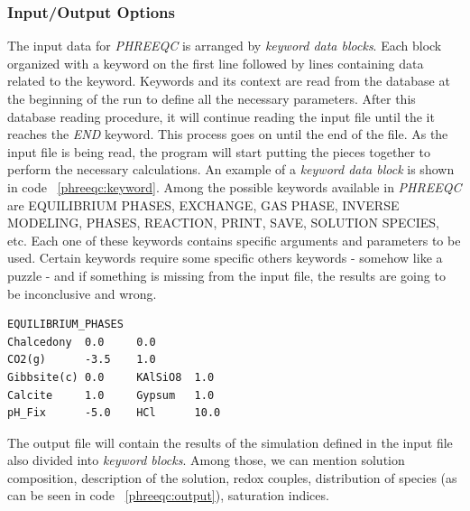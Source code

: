 \documentclass[ppgc,mestrado,english]{iiufrgs}
\begin{document}
\subsubsection{Input/Output Options}
The input data for \emph{PHREEQC} is arranged by \emph{keyword data blocks}. Each block organized with a keyword on the first line followed by lines containing data related to the keyword. Keywords and its context are read from the database at the beginning of the run to define all the necessary parameters. After this database reading procedure, it will continue reading the input file until the it reaches the \emph{END} keyword. This process goes on until the end of the file. As the input file is being read, the program will start putting the pieces together to perform the necessary calculations. An example of a \emph{keyword data block} is shown in code ~\ref{phreeqc:keyword}. Among the possible keywords available in \emph{PHREEQC} are EQUILIBRIUM PHASES, EXCHANGE, GAS PHASE, INVERSE MODELING, PHASES, REACTION, PRINT, SAVE, SOLUTION SPECIES, etc. Each one of these keywords contains specific arguments and parameters to be used. Certain keywords require some specific others keywords - somehow like a puzzle - and if something is missing from the input file, the results are going to be inconclusive and wrong.

\begin{lstlisting}[frame=single, caption=\emph{PHREEQC} keyword data block example, label=phreeqc:keyword]
EQUILIBRIUM_PHASES
Chalcedony  0.0     0.0
CO2(g)      -3.5    1.0
Gibbsite(c) 0.0     KAlSiO8  1.0
Calcite     1.0     Gypsum   1.0
pH_Fix      -5.0    HCl      10.0
\end{lstlisting}


The output file will contain the results of the simulation defined in the input file also divided into \emph{keyword blocks}. Among those, we can mention solution composition, description of the solution, redox couples, distribution of species (as can be seen in code ~\ref{phreeqc:output}), saturation indices.
\end{document}
